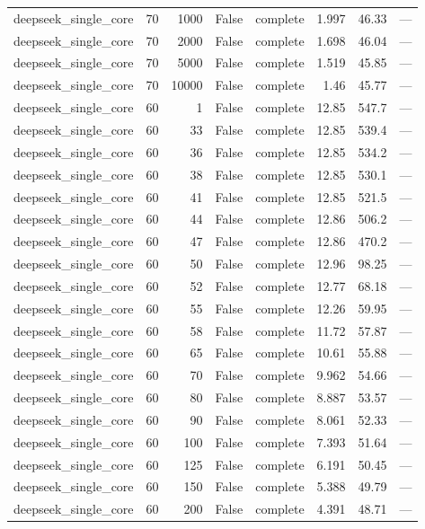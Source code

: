 \begin{tabular}{lrrrlrrl}
deepseek\_single\_core & 70 & 1000 & False & complete & 1.997 & 46.33 & — \\
deepseek\_single\_core & 70 & 2000 & False & complete & 1.698 & 46.04 & — \\
deepseek\_single\_core & 70 & 5000 & False & complete & 1.519 & 45.85 & — \\
deepseek\_single\_core & 70 & 10000 & False & complete & 1.46 & 45.77 & — \\
deepseek\_single\_core & 60 & 1 & False & complete & 12.85 & 547.7 & — \\
deepseek\_single\_core & 60 & 33 & False & complete & 12.85 & 539.4 & — \\
deepseek\_single\_core & 60 & 36 & False & complete & 12.85 & 534.2 & — \\
deepseek\_single\_core & 60 & 38 & False & complete & 12.85 & 530.1 & — \\
deepseek\_single\_core & 60 & 41 & False & complete & 12.85 & 521.5 & — \\
deepseek\_single\_core & 60 & 44 & False & complete & 12.86 & 506.2 & — \\
deepseek\_single\_core & 60 & 47 & False & complete & 12.86 & 470.2 & — \\
deepseek\_single\_core & 60 & 50 & False & complete & 12.96 & 98.25 & — \\
deepseek\_single\_core & 60 & 52 & False & complete & 12.77 & 68.18 & — \\
deepseek\_single\_core & 60 & 55 & False & complete & 12.26 & 59.95 & — \\
deepseek\_single\_core & 60 & 58 & False & complete & 11.72 & 57.87 & — \\
deepseek\_single\_core & 60 & 65 & False & complete & 10.61 & 55.88 & — \\
deepseek\_single\_core & 60 & 70 & False & complete & 9.962 & 54.66 & — \\
deepseek\_single\_core & 60 & 80 & False & complete & 8.887 & 53.57 & — \\
deepseek\_single\_core & 60 & 90 & False & complete & 8.061 & 52.33 & — \\
deepseek\_single\_core & 60 & 100 & False & complete & 7.393 & 51.64 & — \\
deepseek\_single\_core & 60 & 125 & False & complete & 6.191 & 50.45 & — \\
deepseek\_single\_core & 60 & 150 & False & complete & 5.388 & 49.79 & — \\
deepseek\_single\_core & 60 & 200 & False & complete & 4.391 & 48.71 & — \\

\end{tabular}
